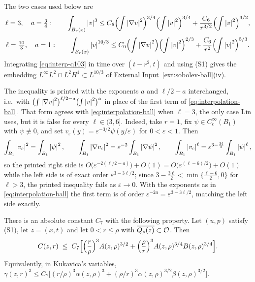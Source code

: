 \documentclass[11pt,reqno]{amsart}
\begin{document}
\begin{remark}\label{rem:interp-instances}
The two cases used below are
\begin{equation}\label{eq:interp-q3}
  \ell=3,\quad a=\tfrac34:\qquad
  \int_{B_{r}(x)}\left\lvert v \right\rvert^{3}
   \le C_{6}\Bigl(\int\left\lvert \nabla v \right\rvert^{2}\Bigr)^{3/4}\Bigl(\int\left\lvert v \right\rvert^{2}\Bigr)^{3/4}
     +\frac{C_{6}}{r^{3/2}}\Bigl(\int\left\lvert v \right\rvert^{2}\Bigr)^{3/2},
\end{equation}
\begin{equation}\label{eq:interp-q103}
  \ell=\tfrac{10}{3},\quad a=1:\qquad
  \int_{B_{r}(x)}\left\lvert v \right\rvert^{10/3}
   \le C_{6}\Bigl(\int\left\lvert \nabla v \right\rvert^{2}\Bigr)\Bigl(\int\left\lvert v \right\rvert^{2}\Bigr)^{2/3}
     +\frac{C_{6}}{r^{2}}\Bigl(\int\left\lvert v \right\rvert^{2}\Bigr)^{5/3}.
\end{equation}
Integrating \eqref{eq:interp-q103} in time over $(t-r^{2},t)$ and using (S1)
gives the embedding $L^{\infty}L^{2}\cap L^{2}H^{1}\subset L^{10/3}$ of
External Input~\ref{ext:sobolev-ball}(iv).

The inequality \cite[(2.1)]{Lin1998} is printed with the exponents $a$ and
$\ell/2-a$ interchanged, i.e.\ with
$\bigl(\int\left\lvert \nabla v \right\rvert^{2}\bigr)^{\ell/2-a}\bigl(\int\left\lvert v \right\rvert^{2}\bigr)^{a}$ in
place of the first term of \eqref{eq:interpolation-ball}. That form agrees with
\eqref{eq:interpolation-ball} when $\ell=3$, the only case Lin uses, but it is
false for every $\ell\in(3,6]$. Indeed, take $r=1$, fix
$\psi\in C_{c}^{\infty}(B_{1})$ with $\psi\not\equiv0$, and set
$v_{\varepsilon}(y)=\varepsilon^{-3/2}\psi(y/\varepsilon)$ for
$0<\varepsilon<1$. Then
\[
  \int_{B_{1}}\left\lvert v_{\varepsilon} \right\rvert^{2}=\int_{B_{1}}\left\lvert \psi \right\rvert^{2},
  \qquad
  \int_{B_{1}}\left\lvert \nabla v_{\varepsilon} \right\rvert^{2}
    =\varepsilon^{-2}\int_{B_{1}}\left\lvert \nabla\psi \right\rvert^{2},
  \qquad
  \int_{B_{1}}\left\lvert v_{\varepsilon} \right\rvert^{\ell}
    =\varepsilon^{3-\frac{3\ell}{2}}\int_{B_{1}}\left\lvert \psi \right\rvert^{\ell},
\]
so the printed right side is
$O\bigl(\varepsilon^{-2(\ell/2-a)}\bigr)+O(1)=O\bigl(\varepsilon^{(\ell-6)/2}\bigr)+O(1)$
while the left side is of exact order $\varepsilon^{3-3\ell/2}$; since
$3-\tfrac{3\ell}{2}<\min\{\tfrac{\ell-6}{2},0\}$ for $\ell>3$, the printed inequality
fails as $\varepsilon\to0$. With the exponents as in
\eqref{eq:interpolation-ball} the first term is of order
$\varepsilon^{-2a}=\varepsilon^{3-3\ell/2}$, matching the left side exactly.
\end{remark}

\begin{lemma}\label{lem:interpolation-cylinder}
There is an absolute constant $C_{7}$ with the following property. Let $(u,p)$
satisfy (S1), let $z=(x,t)$ and let $0<r\le\rho$ with
$\overline{Q_{\rho}(z)}\subset\mathcal{O}$. Then
\begin{equation}\label{eq:lemma-C-decay}
  C(z,r)\;\le\;C_{7}\Bigl[\Bigl(\frac r\rho\Bigr)^{3}A(z,\rho)^{3/2}
     +\Bigl(\frac\rho r\Bigr)^{3}A(z,\rho)^{3/4}B(z,\rho)^{3/4}\Bigr].
\end{equation}
Equivalently, in Kukavica's variables,
$\gamma(z,r)^{3}\le C_{7}\bigl[(r/\rho)^{3}\alpha(z,\rho)^{3}
 +(\rho/r)^{3}\alpha(z,\rho)^{3/2}\beta(z,\rho)^{3/2}\bigr]$.
\end{lemma}
\end{document}
